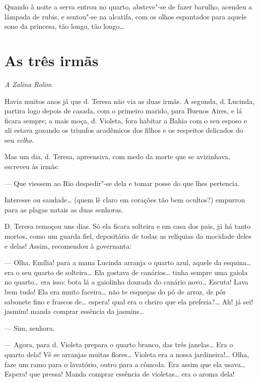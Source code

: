 Quando à noite a serva entrou no quarto, absteve"-se de fazer barulho,
acendeu a lâmpada de rubis, e sentou"-se na alcatifa, com os olhos
espantados para aquele sono da princesa, tão longo, tão longo\ldots{}

\chapter{As três irmãs}

\hfill{}\emph{A Zalina Rolim}

\bigskip

\noindent{}Havia muitos anos já que d. Teresa não via as duas irmãs. A segunda, d.
Lucinda, partira logo depois de casada, com o primeiro marido, para
Buenos Aires, e lá ficara sempre; a mais moça, d. Violeta, fora habitar
a Bahia com o seu esposo e ali estava gozando os triunfos acadêmicos dos
filhos e os respeitos delicados do seu \emph{velho}.

Mas um dia, d. Teresa, apreensiva, com medo da morte que se avizinhava,
escreveu às irmãs:

--- Que viessem ao Rio despedir"-se dela e tomar posse do que lhes
pertencia.

Interesse ou saudade\ldots{} (quem lê claro em corações tão bem ocultos?)
empurrou para as plagas natais as duas senhoras.

D. Teresa remoçou uns dias. Só ela ficara solteira e em casa dos pais,
já há tanto mortos, como um guarda fiel, depositária de todas as
relíquias da mocidade deles e delas! Assim, recomendou à governanta:

--- Olha, Emília! para a mana Lucinda arranja o quarto azul, aquele da
esquina\ldots{} era o seu quarto de solteira\ldots{} Ela gostava de canários\ldots{}
tinha sempre uma gaiola no quarto\ldots{} era isso: bota lá a gaiolinha
dourada do canário novo\ldots{} Escuta! Lava bem tudo! Ela era muito
faceira\ldots{} não te esqueças do pó de arroz, de pôr sabonete fino e
frascos de\ldots{} espera! qual era o cheiro que ela preferia?\ldots{} Ah! já sei!
jasmim! manda comprar essência da jasmins\ldots{}

--- Sim, senhora.

--- Agora, para d. Violeta prepara o quarto branco, das três janelas\ldots{}
Era o quarto dela! Vê se arranjas muitas flores\ldots{} Violeta era a nossa
jardineira!\ldots{} Olha, faze um ramo para o lavatório, outro para a cômoda.
Era assim que ela usava\ldots{} Espera! que pressa! Manda comprar essência de
violetas\ldots{} era o aroma dela!

